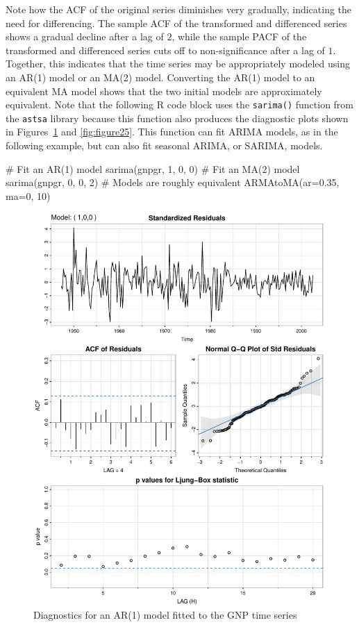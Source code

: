 Note how the ACF of the original series diminishes very gradually, indicating the need for differencing. The sample ACF of the transformed and differenced series shows a gradual decline after a lag of $2$, while the sample PACF of the transformed and differenced series cuts off to non-significance after a lag of $1$. Together, this indicates that the time series may be appropriately modeled using an AR(1) model or an MA(2) model. Converting the AR(1) model to an equivalent MA model shows that the two initial models are approximately equivalent. Note that the following R code block uses the \texttt{sarima()} function from the \texttt{astsa} library because this function also produces the diagnostic plots shown in Figures~\ref{fig:figure24} and \ref{fig:figure25}. This function can fit ARIMA models, as in the following example, but can also fit seasonal ARIMA, or SARIMA, models.

\begin{samepage}
\begin{Rcode}
# Fit an AR(1) model
sarima(gnpgr, 1, 0, 0)
# Fit an MA(2) model
sarima(gnpgr, 0, 0, 2)
# Models are roughly equivalent
ARMAtoMA(ar=0.35, ma=0, 10)
\end{Rcode}
\end{samepage}

\begin{figure}
\centering
\includegraphics[width=.75\textwidth]{figure24.pdf}
\caption{Diagnostics for an AR(1) model fitted to the GNP time series}
\label{fig:figure24}
\end{figure}

